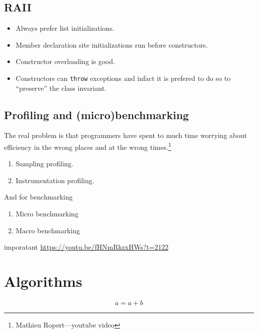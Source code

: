 \documentclass[a4paper]{article}
\begin{document}
\subsection*{RAII}

\begin{itemize}
    \item Always prefer list initializations.
    \item Member declaration site initializations run before constructors.
    \item Constructor overloading is good.
    \item Constructors can \lstinline{throw} exceptions and infact it is prefered to do so to ``preserve'' the class invariant.
\end{itemize}

\subsection*{Profiling and (micro)benchmarking}

The real problem is that programmers have spent to much time worrying about efficiency in the wrong places and at the wrong times.\footnote{Mathieu Ropert---youtube video}

\begin{enumerate}
    \item Sampling profiling.
    \item Instrumentation profiling.
\end{enumerate}

And for benchmarking

\begin{enumerate}
    \item Micro benchmarking
    \item Macro benchmarking
\end{enumerate}

imporatant \url{https://youtu.be/fHNmRkzxHWs?t=2122}

\section*{Algorithms}

\[
    a = a + b
\]
\end{document}
